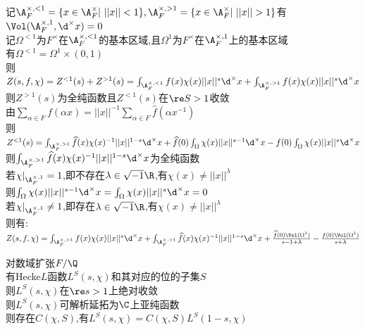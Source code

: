 \begin{zhu}
记$\A_{F}^{\times,<1}=\{x\in\A_{F}^{\times}|\ ||x||<1\},\A_{F}^{\times,>1}=\{x\in\A_{F}^{\times}|\ ||x||>1\}$有$\Vol(\A_{F}^{\times,1},\d^{\times}x)=0$\\
记$\Omega^{<1}$为$F^{\times}$在$\A_{F}^{\times,<1}$的基本区域,且$\Omega^{1}$为$F^{\times}$在$\A_{F}^{\times,1}$上的基本区域\\
有$\Omega^{<1}=\Omega^{1}\times (0,1)$\\
则$Z(s,f,\chi)=Z^{<1}(s)+Z^{>1}(s)=\int_{\A_{F}^{\times,<1}}f(x)\chi(x)||x||^{s}\d^{\times}x+\int_{\A_{F}^{\times,>1}}f(x)\chi(x)||x||^{s}\d^{\times}x$\\
则$Z^{>1}(s)$为全纯函数且$Z^{<1}(s)$在$\re S>1$收敛\\
由$\sum\limits_{\alpha\in F}f(\alpha x)=||x||^{-1}\sum\limits_{\alpha\in F}\widehat{f}(\alpha x^{-1})$\\
则$Z^{<1}(s)=\int_{\A_{F}^{\times,>1}}\widehat{f}(x)\chi(x)^{-1}||x||^{1-s}\d^{\times}x+\widehat{f}(0)\int_{\Omega}\chi(x)||x||^{s-1}\d^{\times}x-f(0)\int_{\Omega}\chi(x)||x||^{s}\d^{\times}x$\\
则$\int_{\A_{F}^{\times,>1}}\widehat{f}(x)\chi(x)^{-1}||x||^{1-s}\d^{\times}x$为全纯函数\\
若$\chi|_{\A_{F}^{\times,1}}=1$,即不存在$\lambda\in \sqrt{-1}\R$,有$\chi(x)\neq ||x||^{\lambda}$\\
则$\int_{\Omega}\chi(x)||x||^{s-1}\d^{\times}x=\int_{\Omega}\chi(x)||x||^{s}\d^{\times}x=0$\\
若$\chi|_{\A_{F}^{\times,1}}\neq1$,即存在$\lambda\in \sqrt{-1}\R$,有$\chi(x)\neq ||x||^{\lambda}$\\
则有:\\
$Z(s,f,\chi)=\int_{\A_{F}^{\times,>1}}f(x)\chi(x)||x||^{s}\d^{\times}x+\int_{\A_{F}^{\times,>1}}\widehat{f}(x)\chi(x)^{-1}||x||^{1-s}\d^{\times}x+\frac{\widehat{f}(0)\Vol(\Omega^{1})}{s-1+\lambda}-\frac{f(0)\Vol(\Omega^{1})}{s+\lambda}$
\end{zhu}

\begin{dingli}
对数域扩张$F/\Q$\\
有Hecke$L$函数$L^{S}(s,\chi)$和其对应的位的子集$S$\\
则$L^{S}(s,\chi)$在$\re s>1$上绝对收敛\\
则$L^{S}(s,\chi)$可解析延拓为$\C$上亚纯函数\\
则存在$C(\chi,S)$,有$L^{S}(s,\chi)=C(\chi,S)L^{S}(1-s,\chi)$
\end{dingli}



%